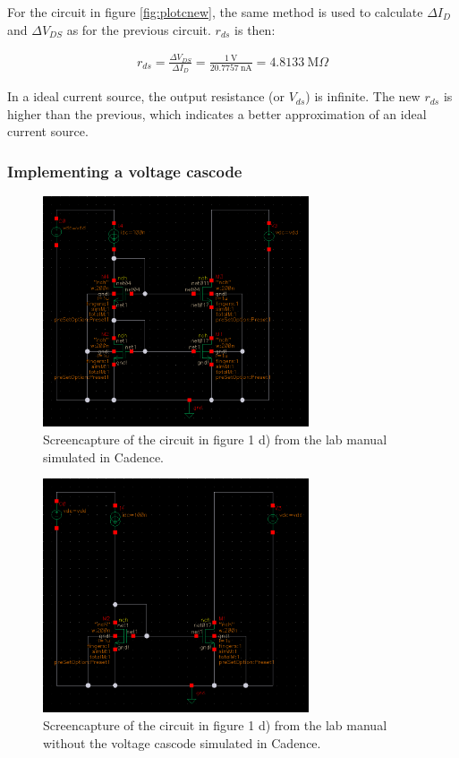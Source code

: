 \documentclass[onecolumn]{article}
\begin{document}
For the circuit in figure \ref{fig:plotcnew}, the same method is used to calculate $\Delta I_D$ and $\Delta V_{DS}$ as for the previous circuit. $r_{ds}$ is then:

\begin{align}
    r_{ds} = \frac{\Delta V_{DS}}{\Delta  I_D} = \frac{ 1 \ \text{V}}{20.7757 \ \text{nA}} = 4.8133 \ \text{M}\Omega
\end{align}


In a ideal current source, the output resistance (or $V_{ds}$) is infinite. The new $r_{ds}$ is higher than the previous, which indicates a better approximation of an ideal current source.

\clearpage

\subsubsection*{Implementing a voltage cascode}

\begin{figure}[h!]
    \centering
    \includegraphics[width=0.7\textwidth]{circuit_d_cascode.png}
    \caption{Screencapture of the circuit in figure 1 d) from the lab manual simulated in Cadence.}
    \label{fig:circuitd}
\end{figure}

\begin{figure}[h!]
    \centering
    \includegraphics[width=0.7\textwidth]{circuit_d_simple.png}
    \caption{Screencapture of the circuit in figure 1 d) from the lab manual without the voltage cascode simulated in Cadence.}
    \label{fig:circuitdsimple}
\end{figure}
\end{document}
